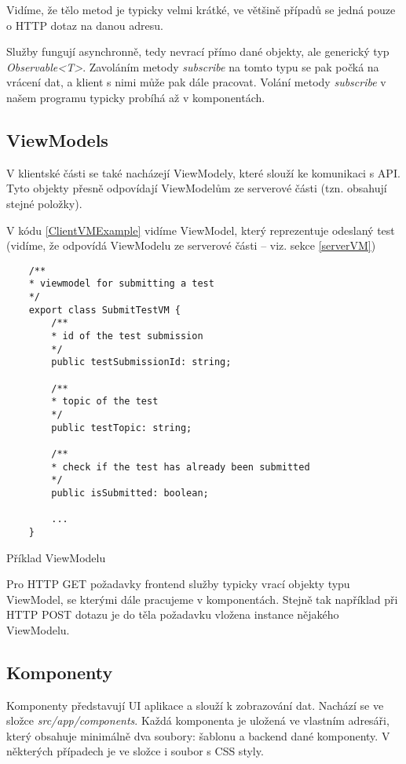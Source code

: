Vidíme, že tělo metod je typicky velmi krátké, ve většině případů se jedná pouze o HTTP dotaz na danou adresu.

Služby fungují asynchronně, tedy nevrací přímo dané objekty, ale generický typ \textit{Observable<T>}. Zavoláním metody \textit{subscribe} na tomto typu se pak počká na vrácení dat, a klient s nimi může pak dále pracovat.
Volání metody \textit{subscribe} v našem programu typicky probíhá až v komponentách.


\subsection{ViewModels}
\label{clientVM}

V klientské části se také nacházejí ViewModely, které slouží ke komunikaci s API. Tyto objekty přesně odpovídají ViewModelům ze serverové části (tzn. obsahují stejné položky).

V kódu \ref{ClientVMExample} vidíme ViewModel, který reprezentuje odeslaný test (vidíme, že odpovídá ViewModelu ze serverové části -- viz. sekce \ref{serverVM})

\begin{program}
	\begin{lstlisting}
	/**
	* viewmodel for submitting a test
	*/
	export class SubmitTestVM {
		/**
		* id of the test submission
		*/
		public testSubmissionId: string;
		
		/**
		* topic of the test
		*/
		public testTopic: string;
		
		/**
		* check if the test has already been submitted
		*/
		public isSubmitted: boolean;
		
		...
	}
	\end{lstlisting}
	\caption{Příklad ViewModelu}
	\label{ClientVMExample}
\end{program}

Pro HTTP GET požadavky frontend služby typicky vrací objekty typu ViewModel, se kterými dále pracujeme v komponentách. Stejně tak například při HTTP POST dotazu je do těla požadavku vložena instance nějakého ViewModelu.

\subsection{Komponenty}

Komponenty představují UI aplikace a slouží k zobrazování dat. Nachází se ve složce \textit{src/app/components}. Každá komponenta je uložená ve vlastním adresáři, který obsahuje minimálně dva soubory: šablonu a backend dané komponenty. V některých případech je ve složce i soubor s CSS styly.

